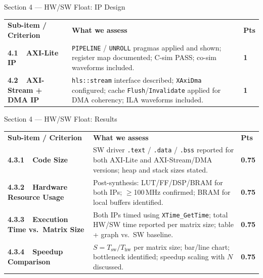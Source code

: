 \documentclass[10pt,aspectratio=169]{beamer}
\begin{document}
\begin{frame}{Section 4 --- HW/SW Float: IP Design}
\setlength{\extrarowheight}{2pt}\setlength{\tabcolsep}{4pt}
\begin{tabular}{m{3.8cm}m{8.8cm}>{\raggedleft\arraybackslash}m{1.4cm}}
\rowcolor{C4}
\textbf{\color{white}Sub-item / Criterion} &
\textbf{\color{white}What we assess} &
\textbf{\color{white}Pts} \tabularnewline
\textbf{4.1\ \ AXI-Lite IP} &
  {\color{TxtMd}\texttt{PIPELINE} / \texttt{UNROLL} pragmas applied and shown; register map documented; C-sim PASS; co-sim waveforms included.} &
  \textbf{\color{C4}1} \tabularnewline
\textbf{4.2\ \ AXI-Stream + DMA IP} &
  {\color{TxtMd}\texttt{hls::stream} interface described; \texttt{XAxiDma} configured; cache \texttt{Flush}/\texttt{Invalidate} applied for DMA coherency; ILA waveforms included.} &
  \textbf{\color{C4}1} \tabularnewline
\end{tabular}
\end{frame}

\begin{frame}{Section 4 --- HW/SW Float: Results}
\setlength{\extrarowheight}{2pt}\setlength{\tabcolsep}{4pt}
\begin{tabular}{m{3.8cm}m{8.8cm}>{\raggedleft\arraybackslash}m{1.4cm}}
\rowcolor{C4}
\textbf{\color{white}Sub-item / Criterion} &
\textbf{\color{white}What we assess} &
\textbf{\color{white}Pts} \tabularnewline
\textbf{4.3.1\ \ Code Size} &
  {\color{TxtMd}SW driver \texttt{.text} / \texttt{.data} / \texttt{.bss} reported for both AXI-Lite and AXI-Stream/DMA versions; heap and stack sizes stated.} &
  \textbf{\color{C4}0.75} \tabularnewline
\textbf{4.3.2\ \ Hardware Resource Usage} &
  {\color{TxtMd}Post-synthesis: LUT/FF/DSP/BRAM for both IPs; $\geq$100\,MHz confirmed; BRAM for local buffers identified.} &
  \textbf{\color{C4}0.75} \tabularnewline
\textbf{4.3.3\ \ Execution Time vs.\ Matrix Size} &
  {\color{TxtMd}Both IPs timed using \texttt{XTime\_GetTime}; total HW/SW time reported per matrix size; table + graph vs.\ SW baseline.} &
  \textbf{\color{C4}0.75} \tabularnewline
\textbf{4.3.4\ \ Speedup Comparison} &
  {\color{TxtMd}$S = T_{\mathrm{sw}}/T_{\mathrm{hw}}$ per matrix size; bar/line chart; bottleneck identified; speedup scaling with $N$ discussed.} &
  \textbf{\color{C4}0.75} \tabularnewline
\end{tabular}
\end{frame}
\end{document}
